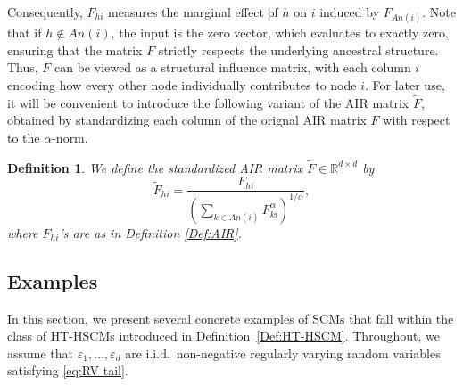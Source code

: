 \documentclass[10pt]{article}
\newtheorem{definition}[theorem]{Definition}
\begin{document}
 Consequently, $F_{hi}$ measures the marginal effect of $h$ on $i$ induced by $F_{{An}(i)}$. 
 Note that if $h \notin {An}(i)$, the input is the zero vector, which evaluates to exactly zero, ensuring that the matrix $F$ strictly respects the underlying ancestral structure. Thus, $F$ can be viewed as a structural influence matrix, with each column $i$ encoding how every other node individually contributes to node $i$.
For later use, it will be convenient to introduce the following variant of the AIR matrix $\widetilde{F} $, obtained by standardizing each column of the orignal AIR matrix $F$ with respect to the $\alpha$-norm.
\begin{definition}\label{Def:st AIR}
 We define the \emph{standardized AIR matrix} $\widetilde{F} \in \mathbb{R}^{d \times d}$ by  
\[
    \widetilde{F}_{hi} = \frac{F_{hi}}{\left(\sum_{k \in {An}(i)} F_{ki}^{\alpha}\right)^{1/\alpha}},
\]
where $F_{hi}$'s are as in Definition \ref{Def:AIR}. 
\end{definition}


\subsection{Examples}

In this section, we present several concrete examples of SCMs that fall within the class of HT-HSCMs introduced in Definition~\ref{Def:HT-HSCM}. Throughout, we assume that $\varepsilon_1,\ldots,\varepsilon_d$ are i.i.d.\ non-negative regularly varying random variables satisfying \eqref{eq:RV tail}.


   
\end{document}
